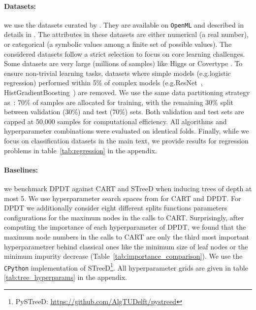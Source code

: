 \paragraph{Datasets:} we use the datasets curated by \cite{grinsztajn2022tree}. They are available on \texttt{OpenML} \cite{10.1145/2641190.2641198} and described in details in \cite[appendix A.1]{grinsztajn2022tree}. The attributes in these datasets are either %
numerical (a real number), or categorical (a symbolic values among a finite set of possible values). %
The considered datasets follow a strict selection \cite[section 3]{grinsztajn2022tree} to focus on core learning challenges. Some datasets are very large (millions of samples) like Higgs or Covertype \cite{higgs_280,covertype_31}. To ensure non-trivial learning tasks, datasets where simple models (e.g.\@ logistic regression) performed within 5\% of complex models (e.g.\@ ResNet~\cite{resnet}, HistGradientBoosting~\cite{scikit-learn}) are removed. We use the same data partitioning strategy as~\cite{grinsztajn2022tree}: 70\% of samples are allocated for training, with the remaining 30\% split between validation (30\%) and test (70\%) sets. Both validation and test sets are capped at 50,000 samples for computational efficiency. All algorithms and hyperparameter combinations were evaluated on identical folds. Finally, while we focus on classification datasets in the main text, we provide results for regression problems in table~\ref{tab:regression} in the appendix.

\paragraph{Baselines:}
we benchmark DPDT against CART and STreeD when inducing trees of depth at most 5.  We use hyperparameter search spaces from \cite{komer-proc-scipy-2014} for CART and DPDT. For DPDT we additionally consider eight different splits functions parameters configurations for the maximum nodes in the calls to CART. Surprisingly, after computing the importance of each hyperparameter of DPDT, we found that the maximum node numbers in the calls to CART are only the third most important hyperparametrer behind classical ones like the minimum size of leaf nodes or the minimum impurity decrease (Table~\ref{tab:importance_comparison}). We use the \texttt{CPython} implementation of STreeD\footnote{PySTreeD: \url{https://github.com/AlgTUDelft/pystreed}}. All hyperparameter grids are given in table \ref{tab:tree_hyperparams} in the appendix.

